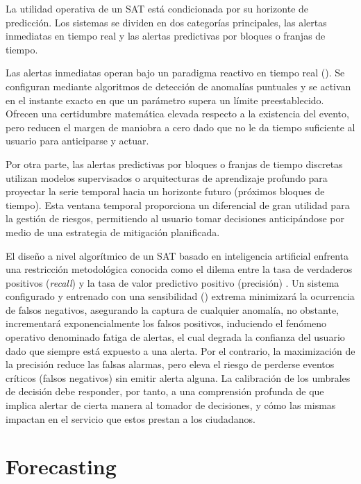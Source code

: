La utilidad operativa de un SAT está condicionada por su horizonte de predicción. Los sistemas se dividen en dos categorías principales, las alertas inmediatas en tiempo real y las alertas predictivas por bloques o franjas de tiempo.

Las alertas inmediatas operan bajo un paradigma reactivo en tiempo real (). Se configuran mediante algoritmos de detección de anomalías puntuales y se activan en el instante exacto en que un parámetro supera un límite preestablecido. Ofrecen una certidumbre matemática elevada respecto a la existencia del evento, pero reducen el margen de maniobra a cero dado que no le da tiempo suficiente al usuario para anticiparse y actuar.

Por otra parte, las alertas predictivas por bloques o franjas de tiempo discretas utilizan modelos supervisados o arquitecturas de aprendizaje profundo para proyectar la serie temporal hacia un horizonte futuro (próximos bloques de tiempo). Esta ventana temporal proporciona un diferencial de gran utilidad para la gestión de riesgos, permitiendo al usuario tomar decisiones anticipándose por medio de una estrategia de mitigación planificada.

El diseño a nivel algorítmico de un SAT basado en inteligencia artificial enfrenta una restricción metodológica conocida como el dilema entre la tasa de verdaderos positivos (\emph{recall}) y la tasa de valor predictivo positivo (precisión) \autocite{fawcett2006}.
Un sistema configurado y entrenado con una sensibilidad () extrema minimizará la ocurrencia de falsos negativos, asegurando la captura de cualquier anomalía, no obstante, incrementará exponencialmente los falsos positivos, induciendo el fenómeno operativo denominado fatiga de alertas, el cual degrada la confianza del usuario \autocite{ancker2017} dado que siempre está expuesto a una alerta. Por el contrario, la maximización de la precisión reduce las falsas alarmas, pero eleva el riesgo de perderse eventos críticos (falsos negativos) sin emitir alerta alguna. La calibración de los umbrales de decisión debe responder, por tanto, a una comprensión profunda de que implica alertar de cierta manera al tomador de decisiones, y cómo las mismas impactan en el servicio que estos prestan a los ciudadanos.

\section{Forecasting}\label{forecasting}

